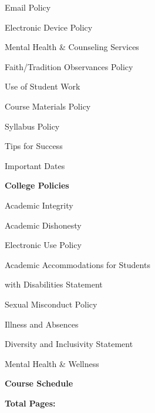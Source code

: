 \documentclass[11pt,letterpaper]{article}
\begin{document}
\begin{minipage}[t]{0.45\textwidth}
\hspace{0.3cm} Email Policy \dotfill \pageref{email_policy} \par
\hspace{0.3cm} Electronic Device Policy \dotfill \pageref{electronic} 
%
\end{minipage}\hfill\begin{minipage}[t]{0.45\textwidth} \par
\hspace{0.3cm} Mental Health \& Counseling Services \dotfill \pageref{mental_health} \par
\hspace{0.3cm} Faith/Tradition Observances Policy \dotfill \pageref{faith} \par
\hspace{0.3cm} Use of Student Work \dotfill \pageref{std_work} \par
\hspace{0.3cm} Course Materials Policy \dotfill \pageref{copyright} \par
\hspace{0.3cm} Syllabus Policy \dotfill \pageref{syllabus} \par
\hspace{0.3cm} Tips for Success \dotfill \pageref{tips} \par
\hspace{0.3cm} Important Dates \dotfill \pageref{imp_dates} \par
{\bfseries\color{stacred} College Policies} \dotfill \pageref{college_polc} \par
\hspace{0.3cm} Academic Integrity \dotfill \pageref{college_acadint} \par
\hspace{0.3cm} Academic Dishonesty \dotfill \pageref{college_acaddis} \par
\hspace{0.3cm} Electronic Use Policy \dotfill \pageref{college_elecuse} \par
\hspace{0.3cm} Academic Accommodations for Students \par
\hspace{0.6cm} with Disabilities Statement \dotfill \pageref{college_acadacc} \par
\hspace{0.3cm} Sexual Misconduct Policy \dotfill \pageref{college_sexmisconduct} \par
\hspace{0.3cm} Illness and Absences \dotfill \pageref{college_illnessabsences} \par
\hspace{0.3cm} Diversity and Inclusivity Statement \dotfill \pageref{college_inclusive} \par
\hspace{0.3cm} Mental Health \& Wellness \dotfill \pageref{mental_wellness} \par
{\bfseries\color{stacred} Course Schedule} \dotfill \pageref{schd} \par
\hfill {\bfseries\color{stacred} Total Pages:} \pageref*{LastPage}
\end{minipage}
\end{document}
